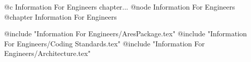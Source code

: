 @c Information For Engineers chapter...
@node Information For Engineers
@chapter Information For Engineers

@include "Information For Engineers/AresPackage.tex"
@include "Information For Engineers/Coding Standards.tex"
@include "Information For Engineers/Architecture.tex"



